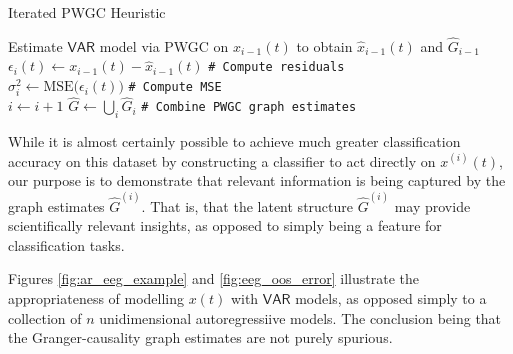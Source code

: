 \documentclass[12pt]{article}
\def\VAR{\mathsf{VAR}}  %
\begin{document}
\begin{algorithm}
  \DontPrintSemicolon

  \BlankLine
  \caption{Iterated PWGC Heuristic}
  \label{alg:iterated_pwgc}
  

   {
    Estimate $\VAR$ model via PWGC on $x_{i - 1}(t)$ to obtain $\widehat{x}_{i - 1}(t)$ and $\widehat{G}_{i - 1}$\\
    $\epsilon_i(t) \leftarrow x_{i - 1}(t) - \widehat{x}_{i - 1}(t)$ \texttt{\# Compute residuals}\\
    $\sigma_i^2 \leftarrow \text{MSE}\big(\epsilon_i(t)\big)$ \texttt{\# Compute MSE}\\
    $i \leftarrow i + 1$
  }
  $\widehat{G} \leftarrow \bigcup_{i} \widehat{G}_{i}$ \texttt{\# Combine PWGC graph estimates}\\
\end{algorithm}

While it is almost certainly possible to achieve much greater
classification accuracy on this dataset by constructing a classifier
to act directly on $x^{(i)}(t)$, our purpose is to demonstrate that
relevant information is being captured by the graph estimates
$\widehat{G}^{(i)}$.  That is, that the latent structure
$\widehat{G}^{(i)}$ may provide scientifically relevant insights, as
opposed to simply being a feature for classification tasks.

Figures \ref{fig:ar_eeg_example} and \ref{fig:eeg_oos_error}
illustrate the appropriateness of modelling $x(t)$ with $\VAR$ models,
as opposed simply to a collection of $n$ unidimensional
autoregressiive models.  The conclusion being that the
Granger-causality graph estimates are not purely spurious.
\end{document}
